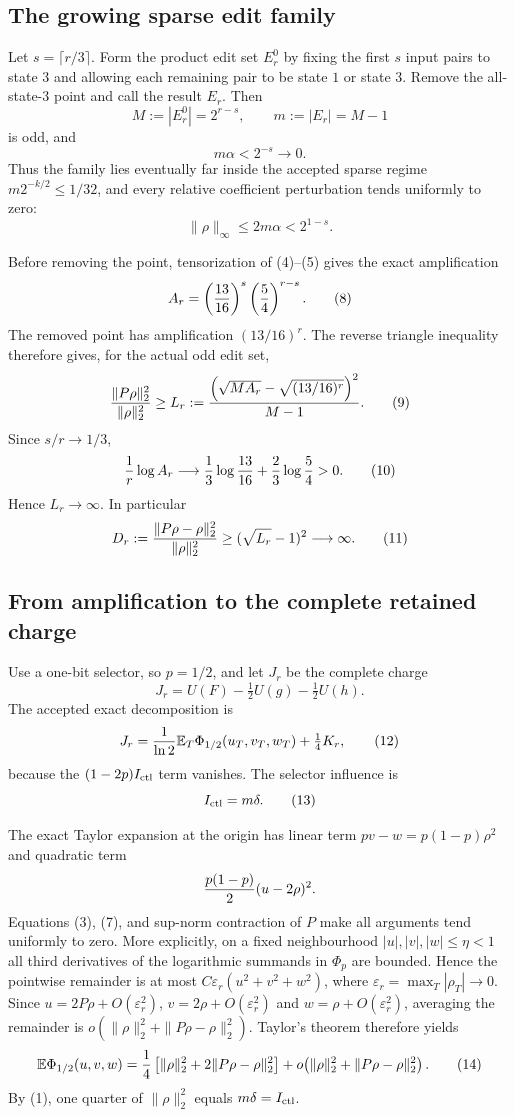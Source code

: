 \subsection*{The growing sparse edit family}

Let $s=\lceil r/3\rceil$.  Form the product edit set $E_r^0$ by fixing the
first $s$ input pairs to state $3$ and allowing each remaining pair to be
state $1$ or state $3$.  Remove the all-state-$3$ point and call the result
$E_r$.  Then
\[
 M:=|E_r^0|=2^{r-s},\qquad m:=|E_r|=M-1
\]
is odd, and
\[
 m\alpha<2^{-s}\longrightarrow0.                        \tag{6}
\]
Thus the family lies eventually far inside the accepted sparse regime
$m2^{-k/2}\le1/32$, and every relative coefficient perturbation tends
uniformly to zero:
\[
 \|\rho\|_\infty\le2m\alpha<2^{1-s}.                    \tag{7}
\]

Before removing the point, tensorization of (4)--(5) gives the exact
amplification
\[
 A_r=\left({13\over16}\right)^s
     \left({5\over4}\right)^{r-s}.                      \tag{8}
\]
The removed point has amplification $(13/16)^r$.  The reverse triangle
inequality therefore gives, for the actual odd edit set,
\[
 {\|P\rho\|_2^2\over\|\rho\|_2^2}
 \ge L_r:=
 {\left(\sqrt{MA_r}-\sqrt{(13/16)^r}\right)^2\over M-1}.\tag{9}
\]
Since $s/r\to1/3$,
\[
 {1\over r}\log A_r\longrightarrow
 {1\over3}\log{13\over16}+{2\over3}\log{5\over4}>0.  \tag{10}
\]
Hence $L_r\to\infty$.  In particular
\[
 D_r:={\|P\rho-\rho\|_2^2\over\|\rho\|_2^2}
 \ge(\sqrt{L_r}-1)^2\longrightarrow\infty.              \tag{11}
\]

\subsection*{From amplification to the complete retained charge}

Use a one-bit selector, so $p=1/2$, and let $J_r$ be the complete charge
\[
 J_r=U(F)-\tfrac12U(g)-\tfrac12U(h).
\]
The accepted exact decomposition is
\[
 J_r={1\over\ln2}\mathbb E_T\Phi_{1/2}(u_T,v_T,w_T)
       +\tfrac14K_r,                                    \tag{12}
\]
because the $(1-2p)I_{\rm ctl}$ term vanishes.  The selector influence is
\[
 I_{\rm ctl}=m\delta.                                   \tag{13}
\]

The exact Taylor expansion at the origin has linear term
$pv-w=p(1-p)\rho^2$ and quadratic term
\[
 {p(1-p)\over2}(u-2\rho)^2.
\]
Equations (3), (7), and sup-norm contraction of $P$ make all arguments tend
uniformly to zero.  More explicitly, on a fixed neighbourhood
$|u|,|v|,|w|\leq\eta<1$ all third derivatives of the logarithmic summands
in $\Phi_p$ are bounded.  Hence the pointwise remainder is at most
$C\varepsilon_r(u^2+v^2+w^2)$, where
$\varepsilon_r=\max_T|\rho_T|\to0$.  Since
$u=2P\rho+O(\varepsilon_r^2)$, $v=2\rho+O(\varepsilon_r^2)$ and
$w=\rho+O(\varepsilon_r^2)$, averaging the remainder is
$o(\|\rho\|_2^2+\|P\rho-\rho\|_2^2)$.  Taylor's theorem therefore yields
\[
 \mathbb E\Phi_{1/2}(u,v,w)
 ={1\over4}\left[\|\rho\|_2^2
          +2\|P\rho-\rho\|_2^2\right]
 +o\!\left(\|\rho\|_2^2+\|P\rho-\rho\|_2^2\right).     \tag{14}
\]
By (1), one quarter of $\|\rho\|_2^2$ equals $m\delta=I_{\rm ctl}$.

